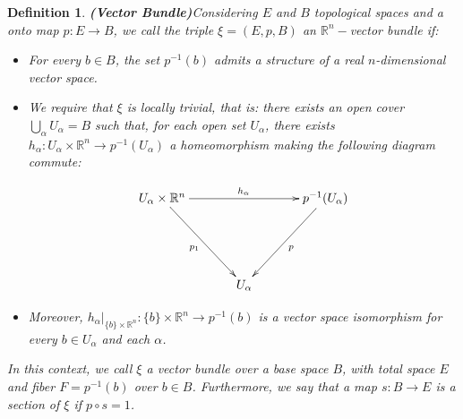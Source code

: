\documentclass[12pt,oneside]{book}
\newtheorem{defi}   {Definition}[chapter]
\newcommand{\ds}{\displaystyle}
\newcommand{\R}{\mathbb{R}}
\begin{document}
    \begin{defi}{\bf (Vector Bundle)}\label{fv_defi}
        Considering $E$ and $B$ topological spaces and a onto map $p:E\to B$, we call the triple $\xi=(E,p,B)$ an $\R^{n}-$vector 
        bundle if:
        
        \begin{itemize}
            \item For every $b\in B$, the set $p^{-1}(b)$ admits a structure of a real $n$-dimensional vector space.
            \item We require that $\xi$ is locally trivial, that is: there exists an open cover 
            $\ds\bigcup_{\alpha}U_{\alpha}=B$ such that, for each open set $U_{\alpha}$, there exists 
            $h_{\alpha}:U_{\alpha}\times\R^{n}\to p^{-1}(U_{\alpha})$ a homeomorphism  making the following diagram commute:
            
            $$\xymatrix @C=0.5cm {
                U_{\alpha}\times\R^{n} \ar[rrrr]^{h_{\alpha}} \ar[ddrr]_{p_{1}} && && p^{-1}(U_{\alpha}) \ar[ddll]^{p} \\
                && && \\
                && U_{\alpha} && 
            }$$
            
            \item Moreover, $h_{\alpha}|_{\{b\}\times\R^{n}}:\{b\}\times\R^{n}\to p^{-1}(b)$ is a vector space isomorphism for every 
            $b\in U_{\alpha}$ and each $\alpha$.
        \end{itemize}
        
        In this context, we call $\xi$ a vector bundle over a base space $B$, with total space $E$ and fiber $F=p^{-1}(b)$ over $b\in B$. 
        Furthermore, we say that a map $s:B\to E$ is a section of $\xi$ if $p\circ s=1$.
    \end{defi}
    
\end{document}
